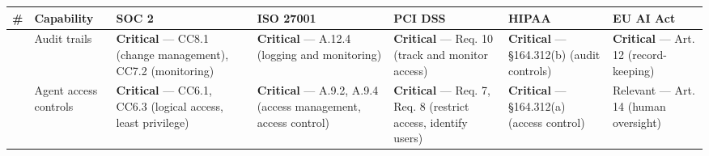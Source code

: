 \documentclass[
  a4paper,
  DIV=11,
  numbers=noendperiod]{scrreprt}
\newcounter{none} %
\begin{document}
\begin{landscape}

{\def\LTcaptype{none} %
\begin{longtable}[]{@{}
  >{\raggedright\arraybackslash}p{}
  >{\raggedright\arraybackslash}p{}
  >{\raggedright\arraybackslash}p{}
  >{\raggedright\arraybackslash}p{}
  >{\raggedright\arraybackslash}p{}
  >{\raggedright\arraybackslash}p{}
  >{\raggedright\arraybackslash}p{}@{}}
\toprule\noalign{}
\begin{minipage}[b]{\linewidth}\raggedright
\#
\end{minipage} & \begin{minipage}[b]{\linewidth}\raggedright
Capability
\end{minipage} & \begin{minipage}[b]{\linewidth}\raggedright
SOC 2
\end{minipage} & \begin{minipage}[b]{\linewidth}\raggedright
ISO 27001
\end{minipage} & \begin{minipage}[b]{\linewidth}\raggedright
PCI DSS
\end{minipage} & \begin{minipage}[b]{\linewidth}\raggedright
HIPAA
\end{minipage} & \begin{minipage}[b]{\linewidth}\raggedright
EU AI Act
\end{minipage} \\
\midrule\noalign{}
\endhead
\bottomrule\noalign{}
\endlastfoot
1 & Audit trails & \textbf{Critical} --- CC8.1 (change management),
CC7.2 (monitoring) & \textbf{Critical} --- A.12.4 (logging and
monitoring) & \textbf{Critical} --- Req. 10 (track and monitor access) &
\textbf{Critical} --- §164.312(b) (audit controls) & \textbf{Critical}
--- Art. 12 (record-keeping) \\
2 & Agent access controls & \textbf{Critical} --- CC6.1, CC6.3 (logical
access, least privilege) & \textbf{Critical} --- A.9.2, A.9.4 (access
management, access control) & \textbf{Critical} --- Req. 7, Req. 8
(restrict access, identify users) & \textbf{Critical} --- §164.312(a)
(access control) & Relevant --- Art. 14 (human oversight) \\

\end{longtable}}
\end{landscape}
\end{document}

